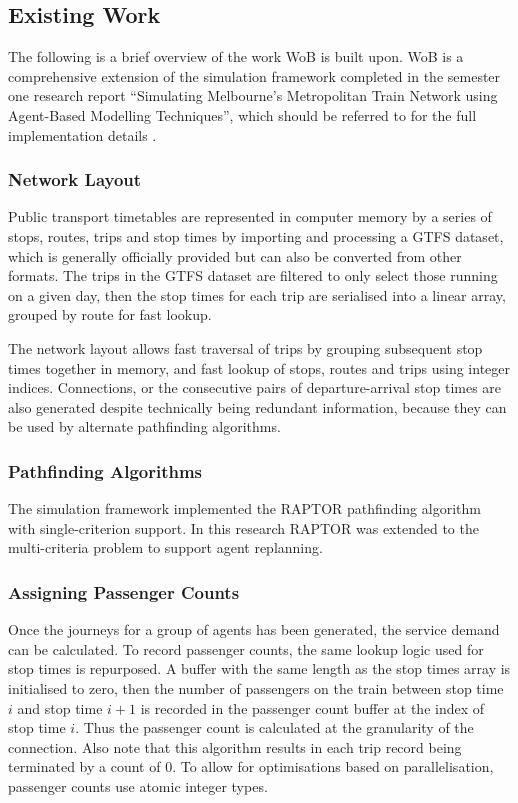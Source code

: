 \subsection{Existing Work}
The following is a brief overview of the work WoB is built upon. WoB is a comprehensive extension of the simulation framework completed in the semester one research report ``Simulating Melbourne's Metropolitan Train Network using Agent-Based Modelling Techniques'', which should be referred to for the full implementation details \cite{benjaminsutherlandSimulatingMelbournesMetropolitan2024}.

\subsubsection{Network Layout}
Public transport timetables are represented in computer memory by a series of stops, routes, trips and stop times by importing and processing a GTFS dataset, which is generally officially provided but can also be converted from other formats. The trips in the GTFS dataset are filtered to only select those running on a given day, then the stop times for each trip are serialised into a linear array, grouped by route for fast lookup.

The network layout allows fast traversal of trips by grouping subsequent stop times together in memory, and fast lookup of stops, routes and trips using integer indices. Connections, or the consecutive pairs of departure-arrival stop times are also generated despite technically being redundant information, because they can be used by alternate pathfinding algorithms.

\subsubsection{Pathfinding Algorithms}
The simulation framework implemented the RAPTOR pathfinding algorithm with single-criterion support. In this research RAPTOR was extended to the multi-criteria problem to support agent replanning. 

\subsubsection{Assigning Passenger Counts}
Once the journeys for a group of agents has been generated, the service demand can be calculated. To record passenger counts, the same lookup logic used for stop times is repurposed. A buffer with the same length as the stop times array is initialised to zero, then the number of passengers on the train between stop time $i$ and stop time $i+1$ is recorded in the passenger count buffer at the index of stop time $i$. Thus the passenger count is calculated at the granularity of the connection. Also note that this algorithm results in each trip record being terminated by a count of 0. To allow for optimisations based on parallelisation, passenger counts use atomic integer types. 

